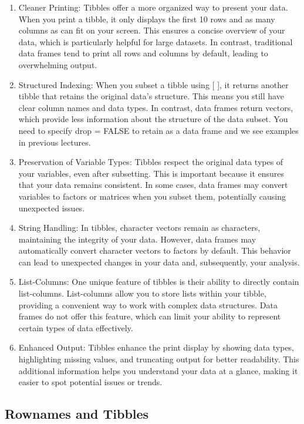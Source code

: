 \documentclass[
]{book}
\begin{document}
\begin{enumerate}
\def\labelenumi{\arabic{enumi}.}
\item
  Cleaner Printing: Tibbles offer a more organized way to present your data. When you print a tibble, it only displays the first 10 rows and as many columns as can fit on your screen. This ensures a concise overview of your data, which is particularly helpful for large datasets. In contrast, traditional data frames tend to print all rows and columns by default, leading to overwhelming output.
\item
  Structured Indexing: When you subset a tibble using {[} {]}, it returns another tibble that retains the original data's structure. This means you still have clear column names and data types. In contrast, data frames return vectors, which provide less information about the structure of the data subset. You need to specify drop = FALSE to retain as a data frame and we see examples in previous lectures.
\item
  Preservation of Variable Types: Tibbles respect the original data types of your variables, even after subsetting. This is important because it ensures that your data remains consistent. In some cases, data frames may convert variables to factors or matrices when you subset them, potentially causing unexpected issues.
\item
  String Handling: In tibbles, character vectors remain as characters, maintaining the integrity of your data. However, data frames may automatically convert character vectors to factors by default. This behavior can lead to unexpected changes in your data and, subsequently, your analysis.
\item
  List-Columns: One unique feature of tibbles is their ability to directly contain list-columns. List-columns allow you to store lists within your tibble, providing a convenient way to work with complex data structures. Data frames do not offer this feature, which can limit your ability to represent certain types of data effectively.
\item
  Enhanced Output: Tibbles enhance the print display by showing data types, highlighting missing values, and truncating output for better readability. This additional information helps you understand your data at a glance, making it easier to spot potential issues or trends.
\end{enumerate}

\hypertarget{rownames-and-tibbles}{%
\subsection{Rownames and Tibbles}\label{rownames-and-tibbles}}
\end{document}
